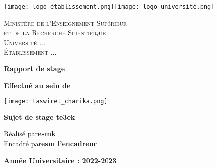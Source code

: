 \documentclass[12pt,a4pape]{report}
\begin{document}
\begin{center}
\texttt{[image: logo\_établissement.png]}\hfill\texttt{[image: logo\_université.png]}
\end{center}
\vspace*{1cm}
\begin{center}
\begin{footnotesize}
\textsc{ Ministère de l'Enseignement Supérieur}\\
\textsc{ et de la Recherche Scientifique}\\
\textsc{ Université ...}\\
\textsc{ Établissement ...}
\end{footnotesize}
\end{center}
\vspace*{1cm}
\begin{center}
\textbf{\Large Rapport de stage }
\end{center}
\vspace*{1cm}
\begin{center}
\textbf{ Effectué au sein de}
\end{center}
\begin{center}
\texttt{[image: taswiret\_charika.png]}
\end{center}
\begin{center}
\begin{center}
\Large \bf Sujet de stage te3ek \\[0.5cm] 

\end{center}
\vspace*{1cm}
\end{center}
\normalsize
\vspace*{1.25cm}
\begin{center}
\begin{minipage}{0.7\textwidth}
 Réalisé par\dotfill \noindent\textbf{esmk}\\[1cm]
 Encadré par\dotfill \noindent\textbf{esm l'encadreur}\\[1cm]
\end{minipage}
\end{center}
\begin{center}
\textbf{ Année Universitaire : 2022-2023 }
\end{center}
\end{document}
